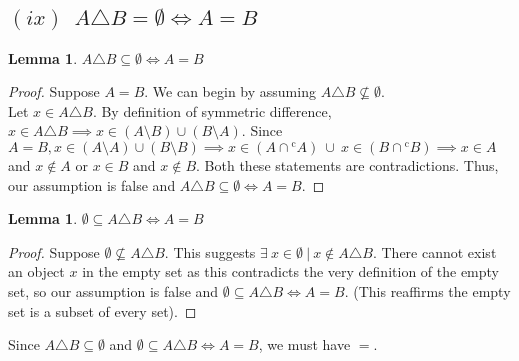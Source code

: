 \documentclass[12pt]{article}
\newtheorem{lemma}[theorem]{Lemma}
\theoremstyle{definition}
\numberwithin{equation}{subsection}
\begin{document}
\subsection*{$(ix) \enspace A \triangle B = \emptyset \iff  A = B $}
\begin{lemma}
$ A \triangle B \subseteq \emptyset \iff  A = B $
\end{lemma}
\begin{proof}
Suppose $A = B.$ We can begin by assuming $ A \triangle B \nsubseteq \emptyset$.\\
Let $x \in A \triangle B.$ By definition of symmetric difference, $x \in A \triangle B \implies x \in (A \setminus B) \cup (B \setminus A).$ Since $A = B, x \in (A \setminus A) \cup (B \setminus B) \implies x \in (A \cap   {^{\mathrm{c}}}{A}) \ \cup \ x \in (B \cap  {^{\mathrm{c}}}{B}) \implies x \in A $ and $x \notin A$ or $x \in B $ and $x \notin B$. Both these statements are contradictions. Thus, our assumption is false and $ A \triangle B \subseteq \emptyset \iff  A = B. $
\end{proof}

\begin{lemma}
$\emptyset \subseteq  A \triangle B \iff  A = B $
\end{lemma}
\begin{proof}
Suppose $\emptyset \nsubseteq  A \triangle B.$ This suggests $\exists \ x \in \emptyset \ |\  x \notin A \triangle B.$ There cannot exist an object $x$ in the empty set as this contradicts the very definition of the empty set, so our assumption is false and $\emptyset \subseteq  A \triangle B \iff  A = B.$ (This reaffirms the empty set is a subset of every set). 
\end{proof}
Since $ A \triangle B \subseteq \emptyset$ and $\emptyset \subseteq  A \triangle B \iff  A = B $, we must have $=.$
\end{document}
